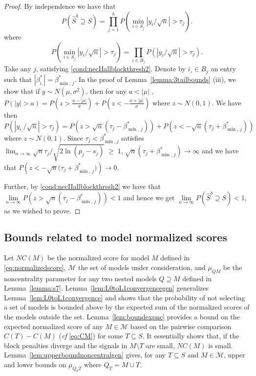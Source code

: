 \documentclass[bj,authoryear]{imsart}
\theoremstyle{plain}
\newcommand{\M}{\mathcal{M}}
\begin{document}
\begin{proof}
By independence we have that
$$P(\hat{S}^{b}\supseteq S)=\prod_{j=1}^b P(\min_{i \in S_j}|y_i/\sqrt{n}| > \tau_j).$$ 
where
$$
P(\min_{i \in S_j}|y_i/\sqrt{n}| > \tau_j)=\prod_{i \in B_j} P(|y_i/\sqrt{n}| > \tau_j). 
$$
Take any $j$, satisfying \eqref{cond:necIIallblockthresh2}. 
Denote by $i_{\circ}\in B_j$ an entry such that $|\beta_{i_{\circ}}^*|=\beta^*_{\min,\,j}$. In the proof of Lemma~\ref{lemma:3tailbounds} (iii), we show that if $y\sim N(\mu, \sigma^2)$, then for any $a<|\mu|$ , $P(|y|>a)  = P(z>\frac{a-|\mu|}{\sigma}) + P(z<-\frac{a+|\mu|}{\sigma})$ where $z\sim N(0,1)$. We have then
$$P(|y_{i_{\circ}}/\sqrt{n}|>\tau_j) 
    = P\left(z>\sqrt{n}\left(\tau_j-\beta_{\min,\,j}^*\right)\right) + P\left(z<-\sqrt{n}\left(\tau_j+\beta_{\min,\,j}^*\right)\right)$$ where $z\sim N(0,1)$. Since $\tau_j<\beta^*_{\min,j}$ satisfies $\lim_{n\to \infty} \sqrt{n}\tau_j/\sqrt{2\ln(p_j-s_j)}\;\geq\;1$, $\sqrt{n}\left(\tau_j+\beta_{\min,\,j}^*\right)\to\infty$ and we have that $P(z<-\sqrt{n}\big(\tau_j+\beta_{\min,\,j}^*\big)) \to 0$.
    
    Further, by \eqref{cond:necIIallblockthresh2}  we have that $\underset{n \to \infty}{\lim}P\left(z>\sqrt{n}\left(\tau_j-\beta_{\min,\,j}^*\right)\right)<1$ and hence we get $\underset{n \to \infty}{\lim}P\left(\hat{S}^{b} \supseteq S \right)<1$, as we wished to prove.
\end{proof}

\subsection{Bounds related to model normalized scores}

Let $NC(M)$ be the normalized score for model $M$ defined in \eqref{eq:normalizedscore}, $\M$ the set of models under consideration, and $\mu_{Q M}$ be the noncentrality parameter for any two nested models $Q \supseteq M$ defined in Lemma~\ref{lemma:s7}. Lemma~\ref{lem:L0toL1convergencegen} generalizes Lemma~\ref{lem:L0toL1convergence} and shows that the probability of not selecting a set of models is bounded above by the expected sum of the normalized scores of the models outside the set. Lemma~\ref{lem:boundexpnc} provides a bound on the expected normalized score of any $M \in \M$ based on the pairwise comparison $C(T)-C(M)$ (\emph{cf} \eqref{eq:CM}) for some $T\subseteq S$. It essentially shows that, if the block penalties diverge and the signals in $M\setminus T$ are small, $NC(M)$ is small.  Lemma~\ref{lem:upperboundnoncentralgen} gives, for any $T\subseteq S$ and $M\in \M$, upper and lower bounds on $\mu_{Q_TT}$ where $Q_T=M\cup T$.
\end{document}
